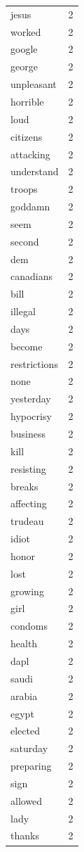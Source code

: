 \begin{tabular}{lr}
jesus & 2 \\
worked & 2 \\
google & 2 \\
george & 2 \\
unpleasant & 2 \\
horrible & 2 \\
loud & 2 \\
citizens & 2 \\
attacking & 2 \\
understand & 2 \\
troops & 2 \\
goddamn & 2 \\
seem & 2 \\
second & 2 \\
dem & 2 \\
canadians & 2 \\
bill & 2 \\
illegal & 2 \\
days & 2 \\
become & 2 \\
restrictions & 2 \\
none & 2 \\
yesterday & 2 \\
hypocrisy & 2 \\
business & 2 \\
kill & 2 \\
resisting & 2 \\
breaks & 2 \\
affecting & 2 \\
trudeau & 2 \\
idiot & 2 \\
honor & 2 \\
lost & 2 \\
growing & 2 \\
girl & 2 \\
condoms & 2 \\
health & 2 \\
dapl & 2 \\
saudi & 2 \\
arabia & 2 \\
egypt & 2 \\
elected & 2 \\
saturday & 2 \\
preparing & 2 \\
sign & 2 \\
allowed & 2 \\
lady & 2 \\
thanks & 2 \\

\end{tabular}
